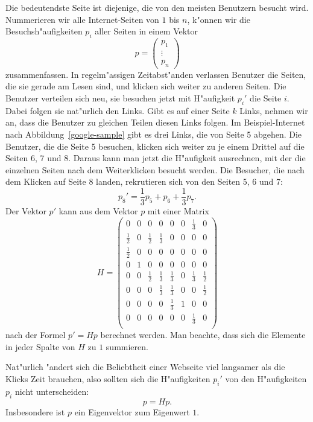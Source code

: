 Die bedeutendste Seite ist diejenige, die von den meisten Benutzern
besucht wird. Nummerieren wir alle Internet-Seiten von $1$ bis $n$,
k"onnen wir die Besuchs\-h"aufigkeiten $p_i$ aller Seiten in einem
Vektor
\[
p=\begin{pmatrix}p_1\\\vdots\\p_n\end{pmatrix}
\]
zusammenfassen. In regelm"assigen Zeitabst"anden verlassen Benutzer
die Seiten, die sie gerade am Lesen sind, und klicken sich weiter zu
anderen Seiten. Die Benutzer verteilen sich neu, sie besuchen jetzt mit
H"aufigkeit $p_i'$ die Seite $i$.
Dabei folgen sie nat"urlich den Links.
Gibt es auf einer Seite $k$ Links, nehmen wir an, dass die Benutzer
zu gleichen Teilen diesen Links folgen.
Im Beispiel-Internet nach Abbildung~\ref{google-sample} gibt es drei
Links, die von Seite 5 abgehen.
Die Benutzer, die die Seite 5
besuchen, klicken sich weiter zu je einem Drittel auf die
Seiten 6, 7 und 8.
Daraus kann man jetzt die H"aufigkeit ausrechnen, mit der die
einzelnen Seiten nach dem Weiterklicken besucht werden.
Die Besucher, die nach dem Klicken auf Seite $8$ landen, rekrutieren
sich von den Seiten 5, 6 und 7:
\[
p_8'=\frac13p_5+p_6+\frac13p_7.
\]
Der Vektor $p'$ kann aus dem Vektor $p$ mit einer Matrix
\[
H=\begin{pmatrix}
      0&0&      0&      0&      0&0&\frac13&      0\\
\frac12&0&\frac12&\frac13&      0&0&      0&      0\\
\frac12&0&      0&      0&      0&0&      0&      0\\
      0&1&      0&      0&      0&0&      0&      0\\
      0&0&\frac12&\frac13&\frac13&0&\frac13&\frac12\\
      0&0&      0&\frac13&\frac13&0&      0&\frac12\\
      0&0&      0&      0&\frac13&1&      0&      0\\
      0&0&      0&      0&0&0&\frac13&0\\
\end{pmatrix}
\]
nach der Formel $p'=Hp$ berechnet werden. Man beachte, dass sich die
Elemente in jeder Spalte von $H$ zu $1$ summieren.

Nat"urlich "andert sich die Beliebtheit einer Webseite viel langsamer
als die Klicks Zeit brauchen, also sollten sich die H"aufigkeiten
$p_i'$ von den H"aufigkeiten $p_i$ nicht unterscheiden:
\[
p=Hp.
\]
Insbesondere ist $p$ ein Eigenvektor zum Eigenwert $1$.

